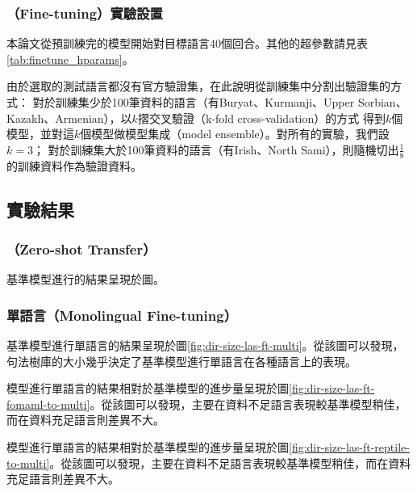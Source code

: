 



\subsubsection{\finetune （Fine-tuning）實驗設置}
本論文從預訓練完的模型開始對目標語言\finetune 40個回合。其他\finetune 的超參數請見表\ref{tab:finetune_hparams}。

由於選取的測試語言都沒有官方驗證集，在此說明從訓練集中分割出驗證集的方式：
對於訓練集少於100筆資料的語言（有Buryat、Kurmanji、Upper Sorbian、Kazakh、Armenian），以$k$摺交叉驗證（k-fold cross-validation）的方式
得到$k$個模型，並對這$k$個模型做模型集成（model ensemble）。對所有的實驗，我們設$k = 3$；
對於訓練集大於100筆資料的語言（有Irish、North Sami），則隨機切出$\frac{1}{8}$的訓練資料作為驗證資料。

\subsection{實驗結果}
\subsubsection{\zeroshot （Zero-shot Transfer）}
%
基準模型進行\zeroshot 的結果呈現於圖。%
\iffalse

\fi
\subsubsection{單語言\finetune （Monolingual Fine-tuning）}

基準模型進行單語言\finetune 的結果呈現於圖\ref{fig:dir-size-las-ft-multi}。從該圖可以發現，句法樹庫的大小幾乎決定了基準模型進行單語言\finetune 在各種語言上的表現。

模型進行單語言的結果相對於基準模型的進步量呈現於圖\ref{fig:dir-size-las-ft-fomaml-to-multi}。從該圖可以發現，主要在資料不足語言表現較基準模型稍佳，而在資料充足語言則差異不大。

\reptile 模型進行單語言\finetune 的結果相對於基準模型的進步量呈現於圖\ref{fig:dir-size-las-ft-reptile-to-multi}。從該圖可以發現，\reptile 主要在資料不足語言表現較基準模型稍佳，而在資料充足語言則差異不大。







